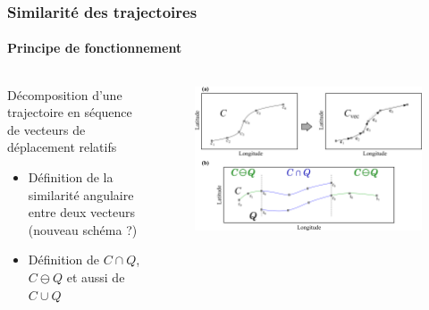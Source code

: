 \documentclass[aspectratio=169, usepdftitle=false, xcolor={dvipsnames}, 9pt,table]{beamer}
\begin{document}
\begin{frame}[c]
    \frametitle{Similarité des trajectoires}
    \framesubtitle{Principe de fonctionnement}
    \begin{columns}
        \begin{column}{0.4\textwidth}
            \footnotesize
           \begin{definition}
               \centering
               Décomposition d'une trajectoire en séquence de vecteurs de déplacement relatifs
           \end{definition}
           \begin{itemize}
               \item Définition de la similarité angulaire entre deux vecteurs (nouveau schéma ?)
               \item Définition de $C \cap Q$, $C \ominus Q$ et aussi de $C \cup Q$
           \end{itemize}
        \end{column}
        \begin{column}{0.6\textwidth}
           \begin{figure}
               \centering
               \includegraphics[width=\textwidth]{Figures/schema_vec_sequence.png}
           \end{figure} 
        \end{column}
    \end{columns} 
\end{frame}
\end{document}
